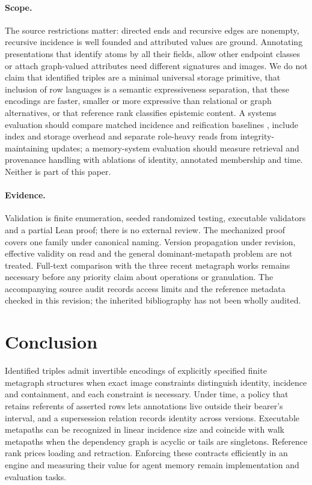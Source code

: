 \documentclass[11pt]{article}
\theoremstyle{plain}
\theoremstyle{definition}
\theoremstyle{remark}
\begin{document}
\paragraph{Scope.}
The source restrictions matter: directed ends and recursive edges are nonempty, recursive
incidence is well founded and attributed values are ground. Annotating presentations
that identify atoms by all their fields, allow other endpoint classes or attach
graph-valued attributes need different signatures and images. We do not claim that
identified triples are a minimal universal storage primitive, that inclusion of row
languages is a semantic expressiveness separation, that these encodings are faster,
smaller or more expressive than relational or graph alternatives, or that reference
rank classifies epistemic content. A systems evaluation should compare matched incidence
and reification baselines \cite{hernandez2015reifying}, include index and storage overhead
and separate role-heavy reads from integrity-maintaining updates; a memory-system
evaluation should measure retrieval and provenance handling with ablations of identity,
annotated membership and time. Neither is part of this paper.

\paragraph{Evidence.}
Validation is finite enumeration, seeded randomized testing, executable validators and a
partial Lean proof; there is no external review. The mechanized proof covers one family under
canonical naming. Version propagation under revision, effective validity on read and the
general dominant-metapath problem are not treated. Full-text comparison with the three
recent metagraph works remains necessary before any priority claim about operations or
granulation. The accompanying source audit records access limits and the reference
metadata checked in this revision; the inherited bibliography has not been wholly audited.

\section{Conclusion}
Identified triples admit invertible encodings of explicitly specified finite metagraph
structures when exact image constraints distinguish identity, incidence and containment,
and each constraint is necessary. Under time, a policy that retains referents of asserted
rows lets annotations live outside their bearer's interval, and a supersession relation
records identity across versions. Executable metapaths can be recognized in linear
incidence size and coincide with walk metapaths when the dependency graph is acyclic or
tails are singletons. Reference rank prices loading and retraction. Enforcing these
contracts efficiently in an engine and measuring their value for agent memory remain
implementation and evaluation tasks.
\end{document}
